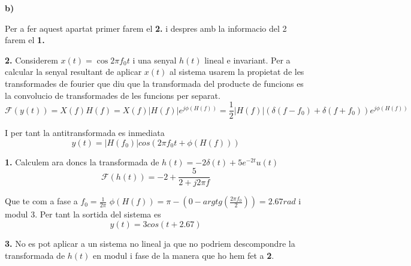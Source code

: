 \documentclass[12pt, a4papre]{article}
\begin{document}
	\textbf{b)}
	
	Per a fer aquest apartat primer farem el \textbf{2.} i despres amb la informacio del 2 farem el  \textbf{1.}
	
	 \textbf{2.} Considerem $x(t)=\cos{2\pi f_0t}$ i una senyal $h(t)$ lineal e invariant. Per a calcular la senyal resultant de aplicar $x(t)$ al sistema usarem la propietat de les transformades de fourier que diu que la transformada del producte de funcions es la convolucio de transformades de les funcions per separat. 
	 \[\mathcal{F}(y(t)) = X(f)H(f) = X(f)|H(f)|e^{j\phi(H(f))} = \frac{1}{2} |H(f)|(\delta(f - f_0) + \delta(f + f_0))e^{j\phi(H(f))}\]
	 
	 I per tant la antitransformada es inmediata
	 \[y(t)=|H(f_0)|cos(2\pi f_0t + \phi(H(f)))\]

	\textbf{1.} Calculem ara doncs la transformada de $h(t) = -2\delta(t) + 5e^{-2t}u(t)$
	\[\mathcal{F}(h(t)) = -2 + \frac{5}{2 + j2\pi f}\]
	
	Que te com a fase a $f_0 = \frac{1}{2\pi}$ $\phi(H(f)) = \pi - (0 - argtg(\frac{2\pi f_0}{2})) = 2.67rad$ i modul 3. Per tant la sortida del sistema es
	\[y(t) = 3cos(t + 2.67)\]
	
	 \textbf{3.} No es pot aplicar a un sistema no lineal ja que no podriem descompondre la transformada de $h(t)$ en modul i fase de la manera que ho hem fet a  \textbf{2}.
	
	
\end{document}
